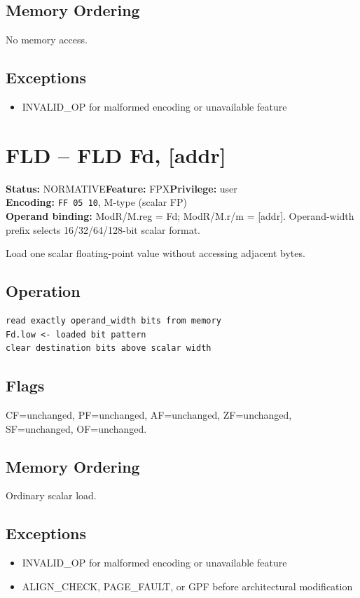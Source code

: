 \documentclass[10pt]{article}
\begin{document}
\subsection*{Memory Ordering}
No memory access.
\subsection*{Exceptions}
\begin{itemize}
\item INVALID\_OP for malformed encoding or unavailable feature
\end{itemize}
\clearpage

\section{FLD -- FLD Fd, [addr]}
\textbf{Status:} NORMATIVE\quad \textbf{Feature:} FPX\quad \textbf{Privilege:} user\\
\textbf{Encoding:} \texttt{FF 05 10}, M-type (scalar FP)\\
\textbf{Operand binding:} ModR/M.reg = Fd; ModR/M.r/m = [addr]. Operand-width prefix selects 16/32/64/128-bit scalar format.

Load one scalar floating-point value without accessing adjacent bytes.

\subsection*{Operation}
\begin{lstlisting}
read exactly operand_width bits from memory
Fd.low <- loaded bit pattern
clear destination bits above scalar width
\end{lstlisting}
\subsection*{Flags}
CF=unchanged, PF=unchanged, AF=unchanged, ZF=unchanged, SF=unchanged, OF=unchanged.
\subsection*{Memory Ordering}
Ordinary scalar load.
\subsection*{Exceptions}
\begin{itemize}
\item INVALID\_OP for malformed encoding or unavailable feature
\item ALIGN\_CHECK, PAGE\_FAULT, or GPF before architectural modification
\end{itemize}
\clearpage
\end{document}
